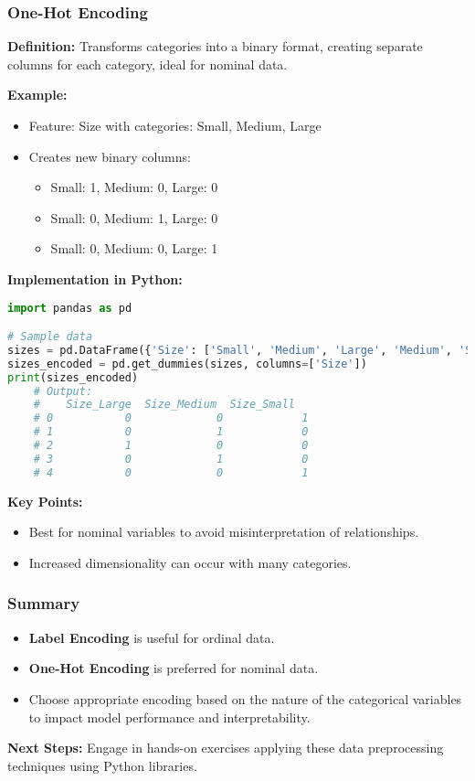 \documentclass{beamer}
\begin{document}
\begin{frame}[fragile]
    \frametitle{One-Hot Encoding}
    
    \textbf{Definition:} Transforms categories into a binary format, creating separate columns for each category, ideal for nominal data.

    \textbf{Example:}
    \begin{itemize}
        \item Feature: Size with categories: Small, Medium, Large
        \item Creates new binary columns:
        \begin{itemize}
            \item Small: 1, Medium: 0, Large: 0
            \item Small: 0, Medium: 1, Large: 0
            \item Small: 0, Medium: 0, Large: 1
        \end{itemize}
    \end{itemize}

    \textbf{Implementation in Python:}
    \begin{lstlisting}[language=Python]
import pandas as pd

# Sample data
sizes = pd.DataFrame({'Size': ['Small', 'Medium', 'Large', 'Medium', 'Small']})
sizes_encoded = pd.get_dummies(sizes, columns=['Size'])
print(sizes_encoded)
    # Output:
    #    Size_Large  Size_Medium  Size_Small
    # 0           0             0            1
    # 1           0             1            0
    # 2           1             0            0
    # 3           0             1            0
    # 4           0             0            1
    \end{lstlisting}

    \textbf{Key Points:}
    \begin{itemize}
        \item Best for nominal variables to avoid misinterpretation of relationships.
        \item Increased dimensionality can occur with many categories.
    \end{itemize}
\end{frame}

\begin{frame}
    \frametitle{Summary}
    
    \begin{itemize}
        \item \textbf{Label Encoding} is useful for ordinal data.
        \item \textbf{One-Hot Encoding} is preferred for nominal data.
        \item Choose appropriate encoding based on the nature of the categorical variables to impact model performance and interpretability.
    \end{itemize}

    \textbf{Next Steps:} Engage in hands-on exercises applying these data preprocessing techniques using Python libraries.
\end{frame}
\end{document}
